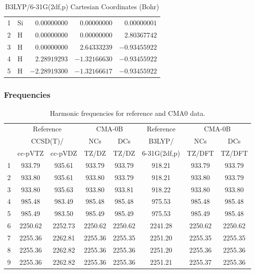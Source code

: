 \documentclass[10pt,oneside]{article}
\begin{document}
\begin{table}[h!]
\centering
\caption{B3LYP/6-31G(2df,p) Cartesian Coordinates (Bohr)}
\begin{tabular}{llrrr}
1  & Si & $ 0.00000000$ & $ 0.00000000$ & $ 0.00000001$ \\
2  & H  & $ 0.00000000$ & $ 0.00000000$ & $ 2.80367742$ \\
3  & H  & $ 0.00000000$ & $ 2.64333239$ & $-0.93455922$ \\
4  & H  & $ 2.28919293$ & $-1.32166630$ & $-0.93455922$ \\
5  & H  & $-2.28919300$ & $-1.32166617$ & $-0.93455922$ \\
\end{tabular}
\end{table}

\clearpage

\subsubsection*{Frequencies}
\begin{table}[h!]
\centering
\caption{Harmonic frequencies for reference and CMA0 data.}
\begin{tabular}{cccccccc}
\toprule
{} & \multicolumn{2}{c}{Reference} & \multicolumn{2}{c}{CMA-0B} &    Reference & \multicolumn{2}{c}{CMA-0B} \\
{} & \multicolumn{2}{c}{CCSD(T)/} &     NCs &     DCs &       B3LYP/ &     NCs &     DCs \\
{} &   cc-pVTZ & cc-pVDZ &   TZ/DZ &   TZ/DZ & 6-31G(2df,p) &  TZ/DFT &  TZ/DFT \\
\midrule
1 &    933.79 &  935.61 &  933.79 &  933.79 &       918.21 &  933.79 &  933.79 \\
2 &    933.80 &  935.61 &  933.80 &  933.79 &       918.21 &  933.80 &  933.79 \\
3 &    933.80 &  935.63 &  933.80 &  933.81 &       918.22 &  933.80 &  933.80 \\
4 &    985.48 &  983.49 &  985.48 &  985.48 &       975.53 &  985.48 &  985.48 \\
5 &    985.49 &  983.50 &  985.49 &  985.49 &       975.53 &  985.49 &  985.48 \\
6 &   2250.62 & 2252.73 & 2250.62 & 2250.62 &      2241.28 & 2250.62 & 2250.62 \\
7 &   2255.36 & 2262.81 & 2255.36 & 2255.35 &      2251.20 & 2255.35 & 2255.35 \\
8 &   2255.36 & 2262.82 & 2255.36 & 2255.36 &      2251.20 & 2255.36 & 2255.36 \\
9 &   2255.36 & 2262.82 & 2255.36 & 2255.36 &      2251.21 & 2255.37 & 2255.36 \\
\bottomrule
\end{tabular}
\end{table}
\end{document}
